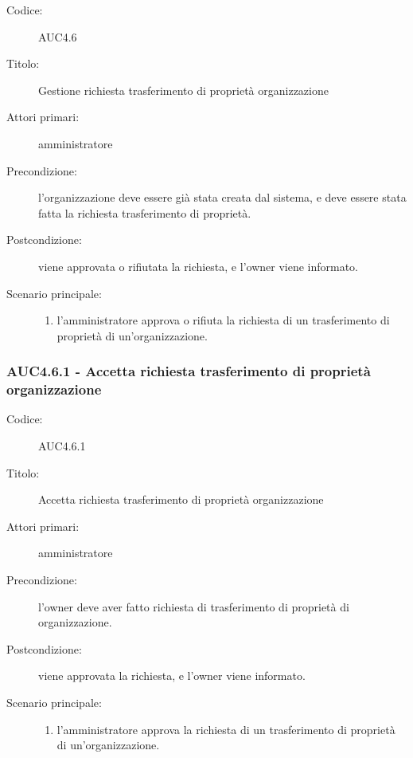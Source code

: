 \documentclass[casi-duso]{subfiles}
\begin{document}
\begin{description}
  \item[Codice:] AUC4.6
  \item[Titolo:] Gestione richiesta trasferimento di proprietà organizzazione
  \item[Attori primari:] amministratore
  \item[Precondizione:] l'organizzazione deve essere già stata creata dal sistema, e deve essere stata fatta la richiesta trasferimento di proprietà.
  \item[Postcondizione:] viene approvata o rifiutata la richiesta, e l'owner viene informato.
  \item[Scenario principale:]
  \begin{enumerate}
    \item l'amministratore approva o rifiuta la richiesta di un trasferimento di proprietà di un'organizzazione.
  \end{enumerate}
\end{description}


\subsubsection{AUC4.6.1 - Accetta richiesta trasferimento di proprietà organizzazione}%
\label{subsub:AUC4.6.1}
\begin{description}
  \item[Codice:] AUC4.6.1
  \item[Titolo:] Accetta richiesta trasferimento di proprietà organizzazione
  \item[Attori primari:] amministratore
  \item[Precondizione:] l'owner deve aver fatto richiesta di trasferimento di proprietà di organizzazione.
  \item[Postcondizione:] viene approvata la richiesta, e l'owner viene informato.
  \item[Scenario principale:]
  \begin{enumerate}
    \item l'amministratore approva la richiesta di un trasferimento di proprietà di un'organizzazione.
  \end{enumerate}
\end{description}  
\end{document}
